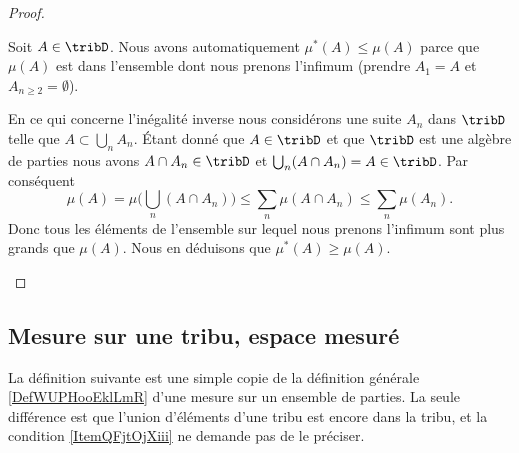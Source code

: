 \begin{proof}
\begin{subproof}
		\spitem[Restriction]
		Soit \( A\in\tribD\). Nous avons automatiquement \( \mu^*(A)\leq \mu(A)\) parce que \( \mu(A)\) est dans l'ensemble dont nous prenons l'infimum (prendre \( A_1=A\) et \( A_{n\geq 2}=\emptyset\)).

		En ce qui concerne l'inégalité inverse nous considérons une suite \( A_n\) dans \( \tribD\) telle que \( A\subset\bigcup_nA_n\). Étant donné que \( A\in\tribD\) et que \( \tribD\) est une algèbre de parties nous avons \( A\cap A_n\in \tribD\) et \( \bigcup_n(A\cap A_n)=A\in\tribD\). Par conséquent
		\begin{equation}
			\mu(A)=\mu\big( \bigcup_n(A\cap A_n) \big)\leq \sum_n\mu(A\cap A_n)\leq \sum_n\mu(A_n).
		\end{equation}
		Donc tous les éléments de l'ensemble sur lequel nous prenons l'infimum sont plus grands que \( \mu(A)\). Nous en déduisons que \( \mu^*(A)\geq \mu(A)\).
	\end{subproof}
\end{proof}

\subsection{Mesure sur une tribu, espace mesuré}

La définition suivante est une simple copie de la définition générale \ref{DefWUPHooEklLmR} d'une mesure sur un ensemble de parties. La seule différence est que l'union d'éléments d'une tribu est encore dans la tribu, et la condition \ref{ItemQFjtOjXiii} ne demande pas de le préciser.

